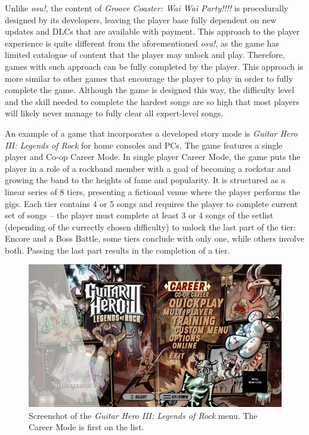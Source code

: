 Unlike \textit{osu!}, the content of \textit{Groove Coaster: Wai Wai Party!!!!} is procedurally designed by its developers, leaving the player base fully dependent on new updates and DLCs that are available with payment. This approach to the player experience is quite different from the aforementioned \textit{osu!}, as the game has limited catalogue of content that the player may unlock and play. Therefore, games with such approach can be fully completed by the player. This approach is more similar to other games that encourage the player to play in order to fully complete the game. Although the game is designed this way, the difficulty level and the skill needed to complete the hardest songs are so high that most players will likely never manage to fully clear all expert-level songs.

An example of a game that incorporates a developed story mode is \textit{Guitar Hero III: Legends of Rock} for home consoles and PCs. The game features a single player and Co-op Career Mode. In single player Career Mode, the game puts the player in a role of a rockband member with a goal of becoming a rockstar and growing the band to the heights of fame and popularity. It is structured as a linear series of 8 tiers, presenting a fictional venue where the player performs the gigs. Each tier contains 4 or 5 songs and requires the player to complete current set of songs -- the player must complete at least 3 or 4 songs of the setlist (depending of the currectly chosen difficulty) to unlock the last part of the tier: Encore and a Boss Battle, some tiers conclude with only one, while others involve both. Passing the last part results in the completion of a tier. 

\begin{figure}[h]
    \centering\includegraphics[scale=0.55]{obrazki/guitarherocareer.jpg}
    \caption{Screenshot of the \textit{Guitar Hero III: Legends of Rock} menu. The Career Mode is first on the list. \cite{careermodegh3}}
    \label{fig:ghero3}
\end{figure}

